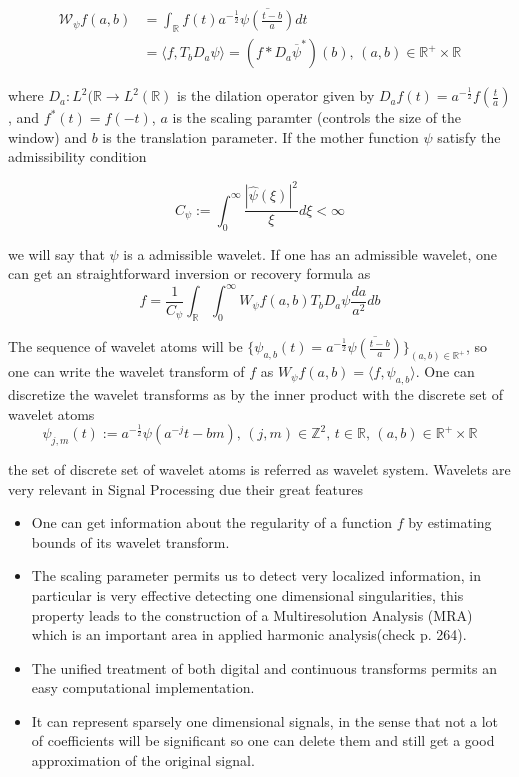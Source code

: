 $$
\begin{aligned}
\mathcal{W}_{\psi}f(a,b)&=\int_{\mathbb{R}}f(t)a^{-\frac{1}{2}}\overline{\psi\left(\frac{t-b}{a}\right)}dt\\
&=\langle f, T_bD_a\psi\rangle = (f\ast D_a\overline{\psi}^*)(b)\text{, } (a, b)\in\mathbb{R}^+\times\mathbb{R} 
\end{aligned}
$$

where $D_a:L^2(\mathbb{R}\longrightarrow L^2(\mathbb{R})$ is the dilation operator given by $D_a f(t)=a^{-\frac{1}{2}}f\left(\frac{t}{a}\right)$, and $f^*(t)=f(-t)$, $a$ is the scaling paramter (controls the size of the window) and $b$ is the translation parameter. If the mother function $\psi$ satisfy the admissibility condition 

$$
C_{\psi}:=\int_0^{\infty}\frac{|\hat{\psi}(\xi)|^2}{\xi}d\xi <\infty
$$

we will say that $\psi$ is a admissible wavelet. If one has an admissible wavelet, one can get an straightforward inversion or recovery formula as
$$
f=\frac{1}{C_{\psi}}\int_{\mathbb{R}}\int_0^{\infty} W_{\psi}f(a,b)T_bD_a\psi\frac{da}{a^2}db
$$

\bigskip

The sequence of wavelet atoms will be $\{\psi_{a,b}(t)=a^{-\frac{1}{2}}\overline{\psi\left(\frac{t-b}{a}\right)}\}_{(a,b)\in\mathbb{R}^+}$, so one can write the wavelet transform of $f$ as $W_{\psi}f(a,b)=\langle f,\psi_{a,b}\rangle$. One can discretize the wavelet transforms as by the inner product with the discrete set of wavelet atoms
$$
\psi_{j,m}(t):=a^{-\frac{1}{2}}\psi(a^{-j}t-bm)\text{,  } (j,m)\in\mathbb{Z}^2\text{,  } t\in \mathbb{R}\text{,   }(a,b)\in\mathbb{R}^+\times\mathbb{R}
$$

the set of discrete set of wavelet atoms is referred as wavelet system. Wavelets are very relevant in Signal Processing due their great features 
\begin{itemize}
\item One can get information about the regularity of a function $f$ by estimating bounds of its wavelet transform.
\item The scaling parameter permits us to detect very localized information, in particular is very effective detecting one dimensional singularities, this property leads to the construction of a Multiresolution Analysis (MRA) which is an important area in applied harmonic analysis(check \cite{Mallat} p. 264).
\item The unified treatment of both digital and continuous transforms permits an easy computational implementation.
\item It can represent sparsely one dimensional signals, in the sense that not a lot of coefficients will be significant so one can delete them and still get a good approximation of the original signal.
\end{itemize}

